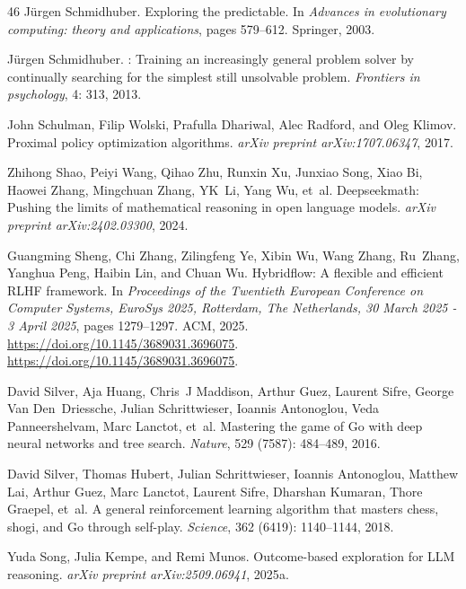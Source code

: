 \begin{thebibliography}{46}
J{\"u}rgen Schmidhuber.
\newblock Exploring the predictable.
\newblock In \emph{Advances in evolutionary computing: theory and applications}, pages 579--612. Springer, 2003.

J{\"u}rgen Schmidhuber.
: Training an increasingly general problem solver by continually searching for the simplest still unsolvable problem.
\newblock \emph{Frontiers in psychology}, 4: 313, 2013.

John Schulman, Filip Wolski, Prafulla Dhariwal, Alec Radford, and Oleg Klimov.
\newblock Proximal policy optimization algorithms.
\newblock \emph{arXiv preprint arXiv:1707.06347}, 2017.

Zhihong Shao, Peiyi Wang, Qihao Zhu, Runxin Xu, Junxiao Song, Xiao Bi, Haowei Zhang, Mingchuan Zhang, YK~Li, Yang Wu, et~al.
\newblock Deepseekmath: Pushing the limits of mathematical reasoning in open language models.
\newblock \emph{arXiv preprint arXiv:2402.03300}, 2024.

Guangming Sheng, Chi Zhang, Zilingfeng Ye, Xibin Wu, Wang Zhang, Ru~Zhang, Yanghua Peng, Haibin Lin, and Chuan Wu.
\newblock Hybridflow: {A} flexible and efficient {RLHF} framework.
\newblock In \emph{Proceedings of the Twentieth European Conference on Computer Systems, EuroSys 2025, Rotterdam, The Netherlands, 30 March 2025 - 3 April 2025}, pages 1279--1297. {ACM}, 2025.
\newblock \url{https://doi.org/10.1145/3689031.3696075}.
\newblock \url{https://doi.org/10.1145/3689031.3696075}.

David Silver, Aja Huang, Chris~J Maddison, Arthur Guez, Laurent Sifre, George Van Den~Driessche, Julian Schrittwieser, Ioannis Antonoglou, Veda Panneershelvam, Marc Lanctot, et~al.
\newblock Mastering the game of {Go} with deep neural networks and tree search.
\newblock \emph{Nature}, 529 (7587): 484--489, 2016.

David Silver, Thomas Hubert, Julian Schrittwieser, Ioannis Antonoglou, Matthew Lai, Arthur Guez, Marc Lanctot, Laurent Sifre, Dharshan Kumaran, Thore Graepel, et~al.
\newblock A general reinforcement learning algorithm that masters chess, shogi, and {Go} through self-play.
\newblock \emph{Science}, 362 (6419): 1140--1144, 2018.

Yuda Song, Julia Kempe, and Remi Munos.
\newblock Outcome-based exploration for {LLM} reasoning.
\newblock \emph{arXiv preprint arXiv:2509.06941}, 2025{a}.


\end{thebibliography}
